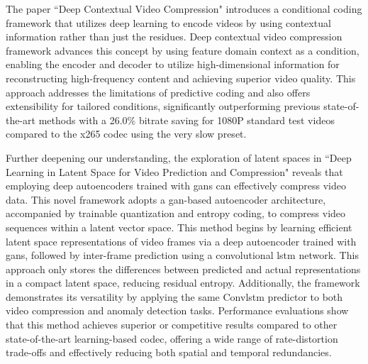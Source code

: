 \documentclass{ioereport}
\begin{document}
The paper ``Deep Contextual Video Compression" \cite{li2021deep} introduces a conditional coding framework that utilizes deep learning to encode videos by using contextual information rather than just the residues. Deep contextual video compression framework advances this concept by using feature domain context as a condition, enabling the encoder and decoder to utilize high-dimensional information for reconstructing high-frequency content and achieving superior video quality. This approach addresses the limitations of predictive coding and also offers extensibility for tailored conditions, significantly outperforming previous state-of-the-art methods with a 26.0\% bitrate saving for 1080P standard test videos compared to the x265 \gls{codec} using the very slow preset.

Further deepening our understanding, the exploration of latent spaces in ``Deep Learning in Latent Space for Video Prediction and Compression" \cite{Liu_latentvideo} reveals that employing deep autoencoders trained with \gls{gan}s can effectively compress video data. This novel framework adopts a \gls{gan}-based autoencoder architecture, accompanied by trainable quantization and entropy coding, to compress video sequences within a latent vector space. This method begins by learning efficient latent space representations of video frames via a deep autoencoder trained with \gls{gan}s, followed by inter-frame prediction using a convolutional \gls{lstm} network. This approach only stores the differences between predicted and actual representations in a compact latent space, reducing residual entropy. Additionally, the framework demonstrates its versatility by applying the same Conv\gls{lstm} predictor to both video compression and anomaly detection tasks. Performance evaluations show that this method achieves superior or competitive results compared to other state-of-the-art learning-based \gls{codec}, offering a wide range of rate-distortion trade-offs and effectively reducing both spatial and temporal redundancies.
\end{document}
